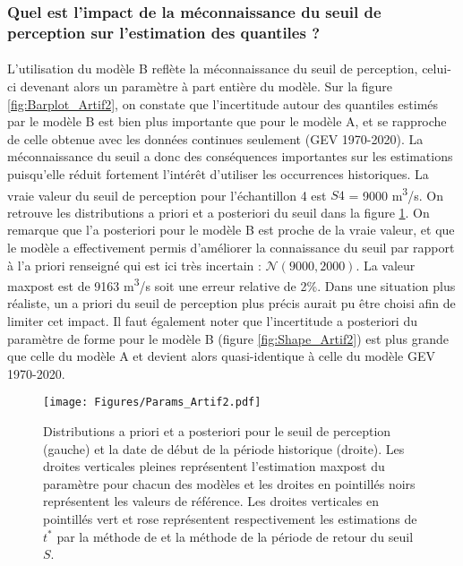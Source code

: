 \documentclass[11pt]{article}
\begin{document}
\FloatBarrier
	
	\subsubsection{Quel est l'impact de la méconnaissance du seuil de perception sur l'estimation des quantiles ?}
	
	\paragraph{} L'utilisation du modèle B reflète la méconnaissance du seuil de perception, celui-ci devenant alors un paramètre à part entière du modèle. Sur la figure \ref{fig:Barplot_Artif2}, on constate que l'incertitude autour des quantiles estimés par le modèle B est bien plus importante que pour le modèle A, et se rapproche de celle obtenue avec les données continues seulement (GEV 1970-2020). La méconnaissance du seuil a donc des conséquences importantes sur les estimations puisqu'elle réduit fortement l'intérêt d'utiliser les occurrences historiques. La vraie valeur du seuil de perception pour l'échantillon 4 est $S4$ = 9000 m\textsuperscript{3}/s. On retrouve les distributions a priori et a posteriori du seuil dans la figure \ref{fig:Params_Artif2}. On remarque que l'a posteriori pour le modèle B est proche de la vraie valeur, et que le modèle a effectivement permis d'améliorer la connaissance du seuil par rapport à l'a priori renseigné qui est ici très incertain : $\mathcal{N}(9000,2000)$. La valeur maxpost est de 9163 m\textsuperscript{3}/s soit une erreur relative de 2\%. Dans une situation plus réaliste, un a priori du seuil de perception plus précis aurait pu être choisi afin de limiter cet impact. Il faut également noter que l'incertitude a posteriori du paramètre de forme pour le modèle B (figure \ref{fig:Shape_Artif2}) est plus grande que celle du modèle A et devient alors quasi-identique à celle du modèle GEV 1970-2020. 
	
	 \begin{figure}[h]
		\centering
		\texttt{[image: Figures/Params\_Artif2.pdf]}	
		\caption{Distributions a priori et a posteriori pour le seuil de perception (gauche) et la date de début de la période historique (droite). Les droites verticales pleines représentent l'estimation maxpost du paramètre pour chacun des modèles et les droites en pointillés noirs représentent les valeurs de référence. Les droites verticales en pointillés vert et rose représentent respectivement les estimations de $t^{*}$ par la méthode de \citet{prosdocimi_german_2018} et la méthode de la période de retour du seuil $S$.}
		\label{fig:Params_Artif2}
	\end{figure}
	
\end{document}
